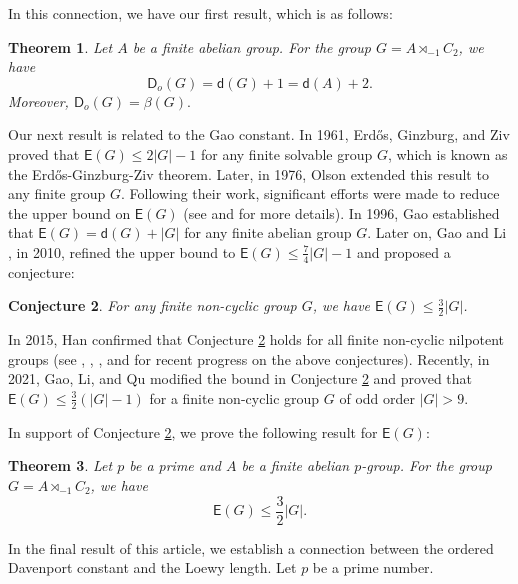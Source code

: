\documentclass[a4paper,11pt]{article}
\newtheorem{thm}{Theorem}[section]
\numberwithin{equation}{section}
\newtheorem{conj}[thm]{Conjecture}
\newcommand{\no}{\noindent}
\begin{document}
\smallskip

\no In this connection, we have our first result, which is as follows:
\begin{thm}\label{Theoremd(G)}
  Let $A$ be a finite abelian group. For the group $G= A \rtimes_{-1} C_2$, we have 
    $$\mathsf{D}_o(G) = \mathsf{d}(G)+1 = \mathsf{d}(A)+2.$$
    Moreover, $\mathsf{D}_o(G)=\beta (G).$
\end{thm}

\no Our next result is related to the Gao constant. In 1961, Erd\H{o}s, Ginzburg, and Ziv \cite{EGZ1961} proved that ${\mathsf{E}}(G) \leq 2|G| - 1$ for any finite solvable group $G$, which is known as the Erd\H{o}s-Ginzburg-Ziv theorem. Later, in 1976, Olson \cite{OLS1976} extended this result to any finite group $G$. Following their work, significant efforts were made to reduce the upper bound on ${\mathsf{E}}(G)$ (see \cite{YUS1988} and \cite{GAO1996B} for more details). In 1996, Gao established that $\mathsf{E}(G)=\mathsf{d}(G)+|G|$ for any finite abelian group $G$. Later on, Gao and Li \cite{GLI2010}, in 2010, refined the upper bound to ${\mathsf{E}}(G) \leq {\frac {7}{4}} |G| - 1$ and proposed a conjecture:

\bigskip

\begin{conj}\emph{\cite{GLI2010}}\label{GAOLI} For any finite non-cyclic group $G$, we have ${\mathsf{E}}(G) \leq {\frac {3}{2}}|G|$.
\end{conj}
\noindent In 2015, Han \cite{HanD} confirmed that Conjecture \ref{GAOLI} holds for all finite non-cyclic nilpotent groups (see \cite{NKG}, \cite{ABR2023}, \cite{DHA2019}, and \cite{YYU2023} for recent progress on the above conjectures). Recently, in 2021, Gao, Li, and Qu \cite{GaoLiQu} modified the bound in Conjecture \ref{GAOLI} and proved that ${\mathsf{E}}(G) \leq {\frac {3}{2}}(|G| - 1)$ for a finite non-cyclic group $G$ of odd order $|G| > 9$.


\no In support of Conjecture \ref{GAOLI}, we prove the following result for $\mathsf{E}(G)$:

\begin{thm}\label{TheoremE(G)} Let $p$ be a prime and $A$ be a finite abelian $p$-group. For the group $G= A \rtimes_{-1} C_2$, we have 
    $$\mathsf{E}(G) \le \frac{3}{2}|G|.$$
\end{thm}



\no In the final result of this article, we establish a connection between the ordered Davenport constant and the Loewy length. Let $p$ be a prime number. 
\end{document}
